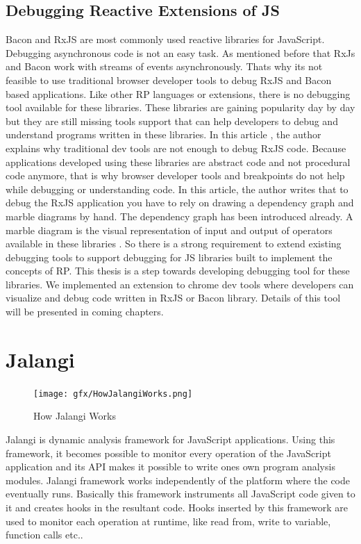 \subsection{Debugging Reactive Extensions of JS}
Bacon and RxJS are most commonly used reactive libraries for JavaScript. Debugging asynchronous code is not an easy task. As mentioned before that RxJs and Bacon work with streams of events asynchronously. That\textquotesingle s why it\textquotesingle s not feasible to use traditional browser developer tools to debug RxJS and Bacon based applications.
Like other RP languages or extensions, there is no debugging tool available for these libraries. These libraries are gaining popularity day by day but they are still missing tools support that can help developers to debug and understand programs written in these libraries.
In this article \cite{StaltzAticleHowToDebugRxJS}, the author explains why traditional dev tools are not enough to debug RxJS code. Because applications developed using these libraries are abstract code and not procedural code anymore, that is why browser developer tools and breakpoints do not help while debugging or understanding code. In this article, the author writes that to debug the RxJS application you have to rely on drawing a dependency graph and marble diagrams by hand. The dependency graph has been introduced already. A marble diagram is the visual representation of input and output of operators available in these libraries \cite{StaltzMarbleDiagrams}.
So there is a strong requirement to extend existing debugging tools to support debugging for JS libraries built to implement the concepts of RP.
This thesis is a step towards developing debugging tool for these libraries. We implemented an extension to chrome dev tools where developers can visualize and debug code written in RxJS or Bacon library. Details of this tool will be presented in coming chapters.

\section{Jalangi} \label{sec:Jalangi}
\begin{figure}[!h]
	\centering
	\texttt{[image: gfx/HowJalangiWorks.png]}
	\caption{How Jalangi Works}
	\label{fig:HowJalangiWorks}
\end{figure}

Jalangi is dynamic analysis framework for JavaScript applications. Using this framework, it becomes possible to monitor every operation of the JavaScript application and its API makes it possible to write one\textquotesingle s own program analysis modules. Jalangi framework works independently of the platform where the code eventually runs. Basically this framework instruments all JavaScript code given to it and creates hooks in the resultant code. Hooks inserted by this framework are used to monitor each operation at runtime, like read from, write to variable, function calls etc.. \cite{Sen:2013:JSR:2491411.2491447}

